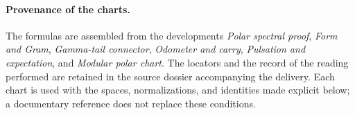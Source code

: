 \paragraph{Provenance of the charts.}
The formulas are assembled from the developments \emph{Polar spectral proof},
\emph{Form and Gram}, \emph{Gamma-tail connector}, \emph{Odometer and
carry}, \emph{Pulsation and expectation}, and \emph{Modular polar chart}.
The locators and the record of the reading performed are retained in the
source dossier accompanying the delivery. Each chart is used with the spaces,
normalizations, and identities made explicit below; a
documentary reference does not replace these conditions.

